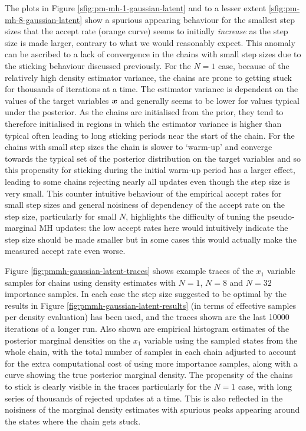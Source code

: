 The plots in Figure \ref{sfig:pm-mh-1-gaussian-latent} and to a lesser extent \ref{sfig:pm-mh-8-gaussian-latent} show a spurious appearing behaviour for the smallest step sizes that the accept rate (orange curve) seems to initially \emph{increase} as the step size is made larger, contrary to what we would reasonably expect. This anomaly can be ascribed to a lack of convergence in the chains with small step sizes due to the sticking behaviour discussed previously. For the $N=1$ case, because of the relatively high density estimator variance, the chains are prone to getting stuck for thousands of iterations at a time. The estimator variance is dependent on the values of the target variables $\boldsymbol{x}$ and generally seems to be lower for values typical under the posterior. As the chains are initialised from the prior, they tend to therefore initialised in regions in which the estimator variance is higher than typical often leading to long sticking periods near the start of the chain. For the chains with small step sizes the chain is slower to `warm-up' and converge towards the typical set of the posterior distribution on the target variables and so this propensity for sticking during the initial warm-up period has a larger effect, leading to some chains rejecting nearly all updates even though the step size is very small. This counter intuitive behaviour of the empirical accept rates for small step sizes and general noisiness of dependency of the accept rate on the step size, particularly for small $N$, highlights the difficulty of tuning the pseudo-marginal \ac{MH} updates: the low accept rates here would intuitively indicate the step size should be made smaller but in some cases this would actually make the measured accept rate even worse.

Figure \ref{fig:pmmh-gaussian-latent-traces} shows example traces of the $x_1$ variable samples for chains using density estimates with $N=1$, $N=8$ and $N=32$ importance samples. In each case the step size suggested to be optimal by the results in Figure \ref{fig:pmmh-gaussian-latent-results} (in terms of effective samples per density evaluation) has been used, and the traces shown are the last 10000 iterations of a longer run. Also shown are empirical histogram estimates of the posterior marginal densities on the $x_1$ variable using the sampled states from the whole chain, with the total number of samples in each chain adjusted to account for the extra computational cost of using more importance samples, along with a curve showing the true posterior marginal density. The propensity of the chains to stick is clearly visible in the traces particularly for the $N=1$ case, with long series of thousands of rejected updates at a time. This is also reflected in the noisiness of the marginal density estimates with spurious peaks appearing around the states where the chain gets stuck.

